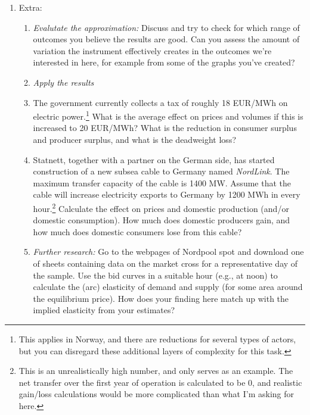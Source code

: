 \documentclass[12pt,a4paper]{article}
\begin{document}
\begin{enumerate}
\item Extra:
\begin{enumerate}
\item \emph{Evalutate the approximation:} Discuss and try to check for which range of outcomes you believe the results are good. Can you assess the amount of variation the instrument effectively creates in the outcomes we're interested in here, for example from some of the graphs you've created?
\item[] \emph{Apply the results}
\item The government currently collects a tax of roughly 18 EUR/MWh on electric power.\footnote{This applies in Norway, and there are reductions for several types of actors, but you can disregard these additional layers of complexity for this task.} What is the average effect on prices and volumes if this is increased to 20 EUR/MWh? What is the reduction in consumer surplus and producer surplus, and what is the deadweight loss?
\item Statnett, together with a partner on the German side, has started construction of a new subsea cable to Germany named \emph{NordLink}. The maximum transfer capacity of the cable is 1400 MW. Assume that the cable will increase electricity exports to Germany by 1200 MWh in every hour.\footnote{This is an unrealistically high number, and only serves as an example. The net transfer over the first year of operation is calculated to be 0, and realistic gain/loss calculations would be more complicated than what I'm asking for here.} Calculate the effect on prices and domestic production (and/or domestic consumption). How much does domestic producers gain, and how much does domestic consumers lose from this cable?
\item \emph{Further research:} Go to the webpages of Nordpool spot and download one of sheets containing data on the market cross for a representative day of the sample. Use the bid curves in a suitable hour (e.g., at noon) to calculate the (arc) elasticity of demand and supply (for some area around the equilibrium price). How does your finding here match up with the implied elasticity from your estimates?
\end{enumerate}
\end{enumerate}
\end{document}
